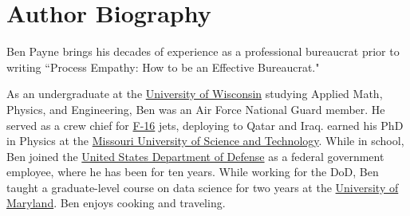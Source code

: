 \section*{Author Biography}

Ben Payne brings his decades of experience as a professional bureaucrat prior to writing ``Process Empathy: How to be an Effective Bureaucrat."

As an undergraduate at the 
\href{https://en.wikipedia.org/wiki/University_of_Wisconsin\%E2\%80\%93Madison}{University of Wisconsin} studying 
Applied Math, Physics, and Engineering, 
Ben was an Air Force National Guard member. He served as a crew chief for 
\href{https://en.wikipedia.org/wiki/General_Dynamics_F-16_Fighting_Falcon}{F-16} jets, deploying to Qatar and Iraq.
earned his PhD in Physics at the 
\href{https://en.wikipedia.org/wiki/Missouri_University_of_Science_and_Technology}{Missouri University of Science and Technology}. While in school,  Ben joined the 
\href{https://en.wikipedia.org/wiki/United_States_Department_of_Defense}{United States Department of Defense} as a federal government employee, where he has been for ten years. While working for the DoD, Ben taught a graduate-level course on data science for two years at the 
\href{https://en.wikipedia.org/wiki/University_of_Maryland,_Baltimore_County}{University of Maryland}. Ben enjoys cooking and traveling. 

